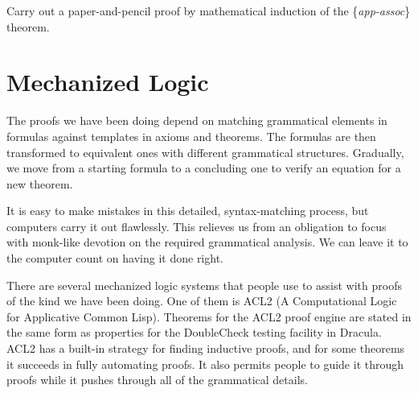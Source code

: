
\begin{ExerciseList}
\Exercise Carry out a paper-and-pencil proof by mathematical induction of the \{\emph{app-assoc}\} theorem.

\begin{comment}
\todo{Rex: I don't understand your hint below.  Is it necessary? Ruben: Sorry. Thought they were necessary assumptions. Will omit them in the section that introduces proofs using mechanized logic.}

\Exercise State the \{\emph{app-assoc}\} theorem in ACL2 notation.
(\emph{Hint}. The theorem must be stated in the form of an implication whose hypothesis requires the objects $xs$ and $ys$ in the definition of A($n$) must be lists, so you will need to state the theorem as an implication whose hypothesis invokes the true-listp function twice to require $xs$ and $ys$ to be lists. The conclusion of the implication will, of course, be the equation between the two concatenation formulas that interchange the concatenation order.)

\Exercise Use Dracula to produce a mechanized proof of the \{\emph{app-assoc}\} theorem.
\end{comment}

\end{ExerciseList}


\section{Mechanized Logic}
\label{sec:mech-logic}
The proofs we have been doing depend on matching grammatical elements in formulas against templates in axioms and theorems. The formulas are then transformed to equivalent ones with different grammatical structures. Gradually, we move from a starting formula to a concluding one to verify an equation for a new theorem.

It is easy to make mistakes in this detailed, syntax-matching process, but computers carry it out flawlessly. This relieves us from an obligation to focus with monk-like devotion on the required grammatical analysis. We can leave it to the computer count on having it done right.

There are several mechanized logic systems that people use to assist with proofs of the kind we have been doing. One of them is ACL2 (A Computational Logic for Applicative Common Lisp). Theorems for the ACL2 proof engine are stated in the same form as properties for the DoubleCheck testing facility in Dracula. ACL2 has a built-in strategy for finding inductive proofs, and for some theorems it succeeds in fully automating proofs. It also permits people to guide it through proofs while it pushes through all of the grammatical details.

